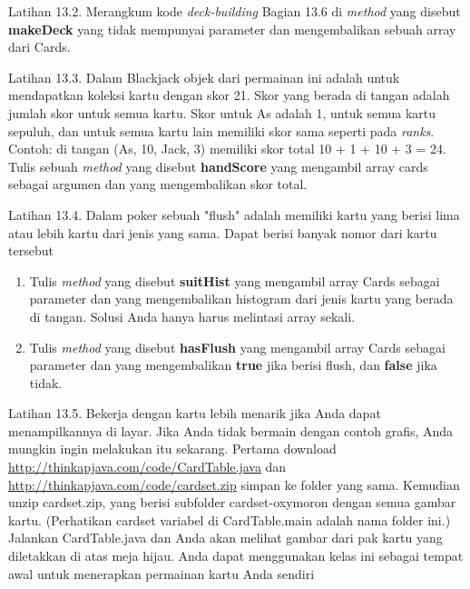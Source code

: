 \noindent Latihan 13.2. Merangkum kode \textit{deck-building} Bagian 13.6 di \textit{method} yang disebut \textbf{makeDeck} yang tidak mempunyai parameter dan mengembalikan sebuah array dari Cards.

\noindent Latihan 13.3. Dalam Blackjack objek dari permainan ini adalah untuk mendapatkan koleksi kartu dengan skor 21. Skor yang berada di tangan adalah jumlah skor untuk semua kartu. Skor untuk As adalah 1, untuk semua kartu sepuluh, dan untuk semua kartu lain memiliki skor sama seperti pada \textit{ranks}. Contoh: di tangan (As, 10, Jack, 3) memiliki skor total 10 + 1 + 10 + 3 = 24.
Tulis sebuah \textit{method} yang disebut \textbf{handScore} yang mengambil array cards sebagai argumen dan yang mengembalikan skor total.

\noindent Latihan 13.4. Dalam poker sebuah "flush" adalah memiliki kartu yang berisi lima atau lebih kartu dari jenis yang sama. Dapat berisi banyak nomor dari kartu tersebut
\begin{enumerate}
    \item Tulis \textit{method} yang disebut \textbf{suitHist} yang mengambil array Cards sebagai parameter dan yang mengembalikan histogram dari jenis kartu yang berada di tangan. Solusi Anda hanya harus melintasi array sekali.
    \item Tulis \textit{method} yang disebut \textbf{hasFlush} yang mengambil array Cards sebagai parameter dan yang mengembalikan \textbf{true} jika berisi flush, dan \textbf{false} jika tidak.
\end{enumerate}

\noindent Latihan 13.5. Bekerja dengan kartu lebih menarik jika Anda dapat menampilkannya di layar. Jika Anda tidak bermain dengan contoh grafis, Anda mungkin ingin melakukan itu sekarang.
Pertama download \url{http://thinkapjava.com/code/CardTable.java} dan \url{http://thinkapjava.com/code/cardset.zip} simpan ke folder yang sama. Kemudian unzip cardset.zip, yang berisi subfolder cardset-oxymoron dengan semua gambar kartu. (Perhatikan cardset variabel di CardTable.main adalah nama folder ini.) Jalankan CardTable.java dan Anda akan melihat gambar dari pak kartu yang diletakkan di atas meja hijau.
Anda dapat menggunakan kelas ini sebagai tempat awal untuk menerapkan permainan kartu Anda sendiri

%
